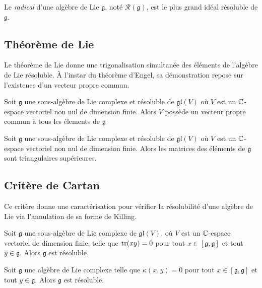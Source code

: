 \omitted

\begin{definition}
    Le \emph{radical} d'une algèbre de Lie $\mathfrak{g}$, noté $\mathcal{R}(\mathfrak{g})$, est le plus grand idéal résoluble de $\mathfrak{g}$.
\end{definition}

\subsection{Théorème de Lie}

Le théorème de Lie donne une trigonalisation simultanée des éléments de l'algèbre de Lie résoluble. À l'instar du théorème d'Engel, sa démonstration repose sur l'existence d'un vecteur propre commun.

\begin{lemma}
    Soit $\mathfrak{g}$ une sous-algèbre de Lie complexe et résoluble de $\mathfrak{gl}(V)$ où $V$ est un $\mathbb{C}$-espace vectoriel non nul de dimension finie. Alors $V$ possède un vecteur propre commun à tous les élements de $\mathfrak{g}$
\end{lemma}

\omitted

\begin{theorem}
    Soit $\mathfrak{g}$ une sous-algèbre de Lie complexe et résoluble de $\mathfrak{gl}(V)$ où $V$ est un $\mathbb{C}$-espace vectoriel non nul de dimension finie. Alors les matrices des éléments de $\mathfrak{g}$ sont triangulaires supérieures. 
\end{theorem}

\omitted

\subsection{Critère de Cartan}

Ce critère donne une caractérisation pour vérifier la résolubilité d'une algèbre de Lie via l'annulation de sa forme de Killing. 

\begin{theorem}
    Soit $\mathfrak{g}$ une sous-algèbre de Lie complexe de $\mathfrak{gl}(V)$, où $V$ est un $\mathbb{C}$-espace vectoriel de dimension finie, telle que $\operatorname{tr}(xy)=0$ pour tout $x\in [\mathfrak{g}, \mathfrak{g}]$ et tout $y\in\mathfrak{g}$. Alors $\mathfrak{g}$ est résoluble.
\end{theorem}

\omitted

\begin{corollary}
    Soit $\mathfrak{g}$ une algèbre de Lie complexe telle que $\kappa(x, y) = 0$ pour tout $x \in [\mathfrak{g}, \mathfrak{g}]$ et tout $y \in \mathfrak{g}$. Alors $\mathfrak{g}$ est résoluble.
\end{corollary}

